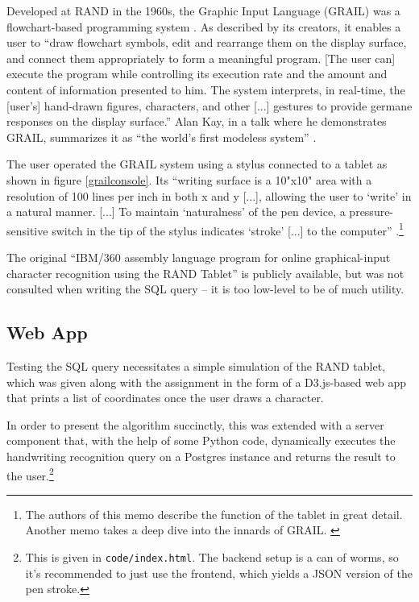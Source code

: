\documentclass[sigconf]{acmart}
\begin{document}
Developed at RAND in the 1960s, the Graphic Input Language (GRAIL) was a flowchart-based programming system \cite{kay,grailang,grail}. As described by its creators, it enables a user to \enquote{draw flowchart symbols, edit and rearrange them on the display surface, and connect them appropriately to form a meaningful program. [The user can] execute the program while controlling its execution rate and the amount and content of information presented to him. The system interprets, in real-time, the [user's] hand-drawn figures, characters, and other [...] gestures to provide germane responses on the display surface.} \cite{grailang} Alan Kay, in a talk where he demonstrates GRAIL, summarizes it as \enquote{the world's first modeless system}
\cite{kay}.

The user operated the GRAIL system using a stylus connected to a tablet as shown in figure \ref{grailconsole}. Its \enquote{writing surface is a 10"x10" area with a resolution of 100 lines per inch in both x and y [...], allowing the user to \enquote{write} in a natural manner. [...] To maintain \enquote{naturalness} of the pen device, a pressure-sensitive switch in the tip of the stylus indicates \enquote{stroke} [...] to the computer} \cite{tablet}.\footnote{The authors of this memo describe the function of the tablet in great detail. Another memo takes a deep dive into the innards of GRAIL. \cite{details}}

The original \enquote{IBM/360 assembly language program for online graphical-input character recognition using the RAND Tablet} \cite{source} is publicly available, but was not consulted when writing the SQL query – it is too low-level to be of much utility.

\subsection{Web App}

Testing the SQL query necessitates a simple simulation of the RAND tablet, which was given along with the assignment in the form of a D3.js-based web app that prints a list of coordinates once the user draws a character.

In order to present the algorithm succinctly, this was extended with a server component that, with the help of some Python code, dynamically executes the handwriting recognition query on a Postgres instance and returns the result to the user.\footnote{This is given in \texttt{code/index.html}. The backend setup is a can of worms, so it's recommended to just use the frontend, which yields a JSON version of the pen stroke.}
\end{document}

